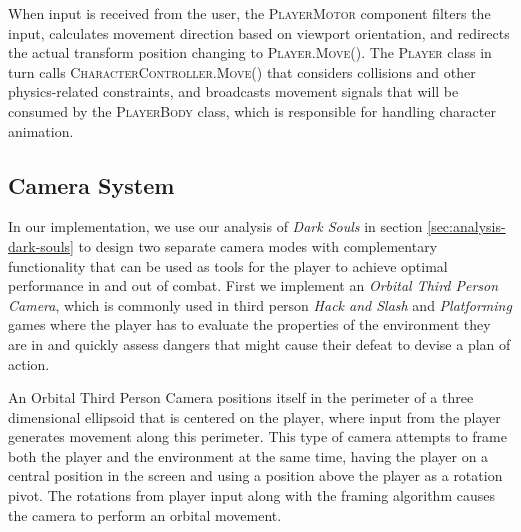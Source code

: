 When input is received from the user, the \textsc{PlayerMotor} component filters the input, calculates movement direction based on viewport orientation, and redirects the actual transform position changing to \textsc{Player.Move()}. The \textsc{Player} class in turn calls \textsc{CharacterController.Move()} that considers collisions and other physics-related constraints, and broadcasts movement signals that will be consumed by the \textsc{PlayerBody} class, which is responsible for handling character animation.




\subsection{Camera System}
\label{sec:lock-on-camera}

In our implementation, we use our analysis of \emph{Dark Souls} in section \ref{sec:analysis-dark-souls} to design two separate camera modes with complementary functionality that can be used as tools for the player to achieve optimal performance in and out of combat. First we implement an \emph{Orbital Third Person Camera}, which is commonly used in third person \emph{Hack and Slash} and \emph{Platforming} games where the player has to evaluate the properties of the environment they are in and quickly assess dangers that might cause their defeat to devise a plan of action.

An Orbital Third Person Camera positions itself in the perimeter of a three dimensional ellipsoid that is centered on the player, where input from the player generates movement along this perimeter. This type of camera attempts to frame both the player and the environment at the same time, having the player on a central position in the screen and using a position above the player as a rotation pivot. The rotations from player input along with the framing algorithm causes the camera to perform an orbital movement.

